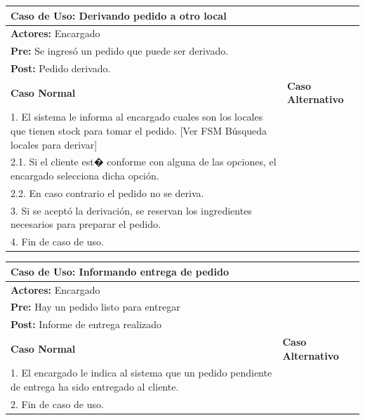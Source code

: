 \documentclass[a4paper,11pt] {article}
\begin{document}
\begin{center}
	\begin{tabular}{ | p{6.5cm} | p{6.5cm} | }
		\hline
			\multicolumn{2}{|l|}{\textbf{Caso de Uso:} Derivando pedido a otro local} \\
		\hline
			\multicolumn{2}{|l|}{\textbf{Actores:} Encargado} \\
		\hline
			\multicolumn{2}{|l|}{\textbf{Pre:} Se ingres\'o un pedido que puede ser derivado.} \\
		\hline
			\multicolumn{2}{|l|}{\textbf{Post:} Pedido derivado.} \\
		\hline
		\textbf{Caso Normal} & \textbf{Caso Alternativo}	\\
		\hline
		1. El sistema le informa al encargado cuales son los locales que tienen stock para tomar el pedido. [Ver FSM B\'usqueda locales para derivar] &	\\
		\hline
		2.1. Si el cliente est� conforme con alguna de las opciones, el encargado selecciona dicha opci\'on. &	\\
		\hline
		2.2. En caso contrario el pedido no se deriva. &	\\
		\hline
		3. Si se acept\'o la derivaci\'on, se reservan los ingredientes necesarios para preparar el pedido. &	\\
		\hline
		4. Fin de caso de uso. &	\\
		\hline
	\end{tabular}
\end{center}

\begin{center}
	\begin{tabular}{ | p{6.5cm} | p{6.5cm} | }
		\hline
			\multicolumn{2}{|l|}{\textbf{Caso de Uso:} Informando entrega de pedido} \\
		\hline
			\multicolumn{2}{|l|}{\textbf{Actores:} Encargado} \\
		\hline
			\multicolumn{2}{|l|}{\textbf{Pre:} Hay un pedido listo para entregar} \\
		\hline
			\multicolumn{2}{|l|}{\textbf{Post:} Informe de entrega realizado} \\
		\hline
		\textbf{Caso Normal} & \textbf{Caso Alternativo}	\\
		\hline
		1. El encargado le indica al sistema que un pedido pendiente de entrega ha sido entregado al cliente. &	\\
		\hline
		2. Fin de caso de uso. &	\\
		\hline
	\end{tabular}
\end{center}
\end{document}
